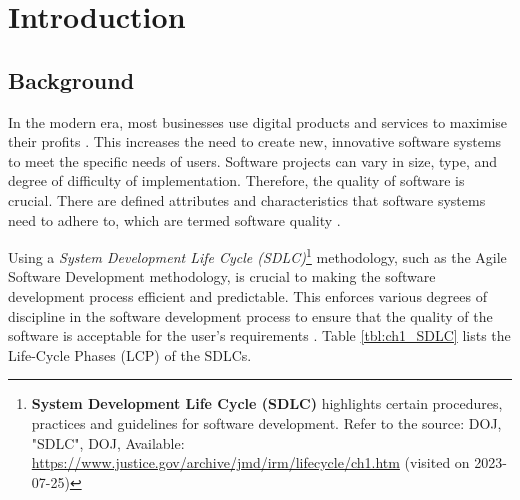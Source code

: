 \chapter{Introduction}
\label{chap:1}

\section{Background}\label{section:ch1_background}
In the modern era, most businesses use digital products and services to maximise their profits \cite{Gralha2018}. This increases the need to create new, innovative software systems to meet the specific needs of users. Software projects can vary in size, type, and degree of difficulty of implementation. Therefore, the quality of software is crucial. There are defined attributes and characteristics that software systems need to adhere to, which are termed software quality \cite{Khan2013}.\par Using a \textit{System Development Life Cycle (SDLC)}\footnote{\textbf{System Development Life Cycle (SDLC)} highlights certain procedures, practices and guidelines for software development. Refer to the source: DOJ, "SDLC", DOJ, Available: \url{https://www.justice.gov/archive/jmd/irm/lifecycle/ch1.htm} (visited on 2023-07-25)} methodology, such as the Agile Software Development methodology, is crucial to making the software development process efficient and predictable. This enforces various degrees of discipline in the software development process to ensure that the quality of the software is acceptable for the user's requirements \cite{Khan2013, Al-Saiyd2015}. Table \ref{tbl:ch1_SDLC} lists the Life-Cycle Phases (LCP) of the SDLCs.

